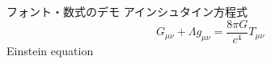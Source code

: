 \begin{frame}{フォント・数式のデモ}
アインシュタイン方程式
\begin{equation}
    G_{\mu\nu}+\Lambda g_{\mu\nu}
    =\frac{8\pi G}{c^4}T_{\mu\nu}
\end{equation}
Einstein equation
\end{frame}
